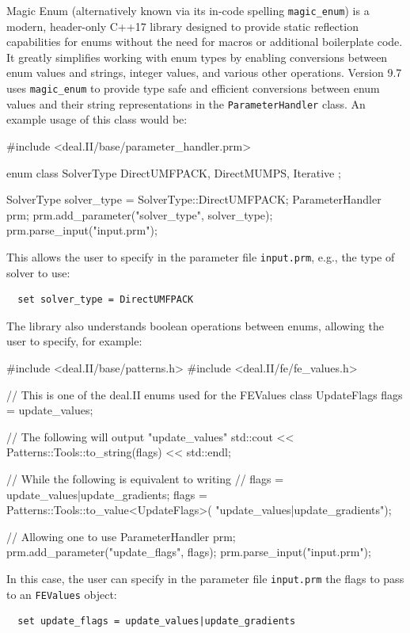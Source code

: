 \documentclass{ansarticle-preprint}
\begin{document}
Magic Enum (alternatively known via its in-code spelling \texttt{magic\_enum}) is a modern, header-only C++17 library designed to provide static reflection capabilities for enums without the need for macros or additional boilerplate code. It greatly simplifies working with enum types by enabling conversions between enum values and strings, integer values, and various other operations. Version 9.7 uses \texttt{magic\_enum} to provide type safe and efficient conversions between enum values and their string representations in the \texttt{ParameterHandler} class. An example usage of this class would be:

\begin{c++}
  #include <deal.II/base/parameter_handler.prm>

  enum class SolverType {
    DirectUMFPACK,
    DirectMUMPS,
    Iterative
  };

  SolverType solver_type = SolverType::DirectUMFPACK;
  ParameterHandler prm;
  prm.add_parameter("solver_type", solver_type);
  prm.parse_input("input.prm");
\end{c++}

This allows the user to specify in the parameter file \verb|input.prm|, e.g., the type of solver to use:
\begin{verbatim}
  set solver_type = DirectUMFPACK
\end{verbatim}

The library also understands boolean operations between enums, allowing the user to specify, for example:
\begin{c++}
  #include <deal.II/base/patterns.h>
  #include <deal.II/fe/fe_values.h>

  // This is one of the deal.II enums used for the FEValues class
  UpdateFlags flags = update_values;

  // The following will output "update_values"
  std::cout << Patterns::Tools::to_string(flags)
            << std::endl;

  // While the following is equivalent to writing 
  // flags = update_values|update_gradients;
  flags = Patterns::Tools::to_value<UpdateFlags>(
    "update_values|update_gradients");

  // Allowing one to use
  ParameterHandler prm;
  prm.add_parameter("update_flags", flags);
  prm.parse_input("input.prm");
\end{c++}

In this case, the user can specify in the parameter file \verb|input.prm| the flags to pass to an \verb|FEValues| object: 
\begin{verbatim}
  set update_flags = update_values|update_gradients
\end{verbatim}
\end{document}
